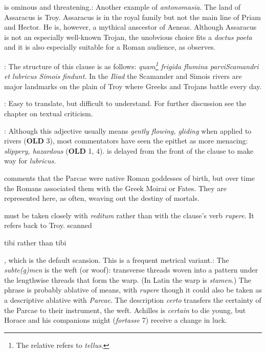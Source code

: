  is ominous and threatening.\indent{}: Another example of \textit{antonomasia}.  The land of Assaracus is Troy.  Assaracus is in the royal family but not the main line of Priam and Hector.  He is, however, a mythical anscestor of Aeneas.  Although Assaracus is not an especially well-known Trojan, the unobvious choice fits a \textit{doctus poeta} and it is also especially suitable for a Roman audience, as \citet[223]{mankin1995} observes.


: The structure of this clause is as follows: \textit{quam\footnote{The relative refers to \textit{tellus}.} frigida flumina \dag parvi\dag Scamandri et lubricus Simois findunt.}  In the \textit{Iliad} the Scamander and Simois rivers are major landmarks on the plain of Troy where Greeks and Trojans battle every day.


: Easy to translate, but difficult to understand.  For further discussion see the chapter on textual criticism.


: Although this adjective usually means \textit{gently flowing, gliding} when applied to rivers (\textbf{OLD} 3), most commentators have seen the epithet as more menacing: \textit{slippery, hazardous} (\textbf{OLD} 1, 4).\indent{} is delayed from the front of the clause to make way for \textit{lubricus}.


\citet[224--225]{mankin1995} comments that the Parcae were native Roman goddesses of birth, but over time the Romans associated them with the Greek Moirai or Fates.  They are represented here, as often, weaving out the destiny of mortals.


 must be taken closely with \textit{reditum} rather than with the clause's verb \textit{rupere}.  It refers back to Troy.\indent{} scanned \begin{metrica}t\-ib\=i rather than t\-ib\-i\end{metrica}, which is the default scansion.  This is a frequent metrical variant.\indent{}: The \textit{subte(g)men} is the weft (or woof): transverse threads woven into a pattern under the lengthwise threads that form the warp.  (In Latin the warp is \textit{stamen}.)  The phrase is probably ablative of means, with \textit{rupere} though it could also be taken as a descriptive ablative with \textit{Parcae}.  The description \textit{certo} transfers the certainty of the Parcae to their instrument, the weft.  Achilles is \textit{certain} to die young, but Horace and his companions might (\textit{fortasse} 7) receive a change in luck.

